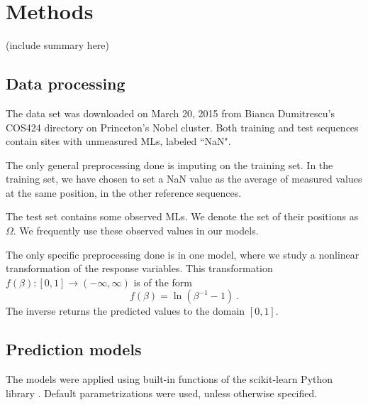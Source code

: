 \documentclass{article} %
\begin{document}
\section{Methods}
(include summary here)

\subsection{Data processing}

The data set was downloaded on March 20, 2015 from Bianca Dumitrescu's COS424 directory on Princeton's Nobel cluster. Both training and test sequences contain sites with unmeasured MLs, labeled ``NaN".

The only general preprocessing done is imputing on the training set. In the training set, we have chosen to set a NaN value as the average of measured values at the same position, in the other reference sequences. 

The test set contains some observed MLs. We denote the set of their positions as $\Omega$. We frequently use these observed values in our models.

The only specific preprocessing done is in one model, where we study a nonlinear transformation of the response variables. This transformation $f(\beta): [0,1] \to (-\infty,\infty)$ is of the form
\[ f(\beta) = \ln(\beta^{-1} - 1) \ .\]
The inverse returns the predicted values to the domain $[0,1]$.

\subsection{Prediction models}

The models were applied using built-in functions of the scikit-learn Python library \cite{scikit-learn}. Default parametrizations were used, unless otherwise specified.
\end{document}
